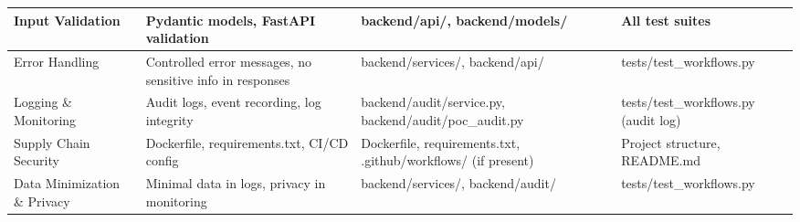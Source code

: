 \documentclass[12pt,a4paper]{report}
\begin{document}
\begin{longtable}{|p{3cm}|p{4cm}|p{5cm}|p{4cm}|}
\hline
Input Validation & Pydantic models, FastAPI validation & backend/api/, backend/models/ & All test suites \\
\hline
Error Handling & Controlled error messages, no sensitive info in responses & backend/services/, backend/api/ & tests/test\_workflows.py \\
\hline
Logging \& Monitoring & Audit logs, event recording, log integrity & backend/audit/service.py, backend/audit/poc\_audit.py & tests/test\_workflows.py (audit log) \\
\hline
Supply Chain Security & Dockerfile, requirements.txt, CI/CD config & Dockerfile, requirements.txt, .github/workflows/ (if present) & Project structure, README.md \\
\hline
Data Minimization \& Privacy & Minimal data in logs, privacy in monitoring & backend/services/, backend/audit/ & tests/test\_workflows.py \\
\hline
\end{longtable}


\printbibliography
\end{document}
